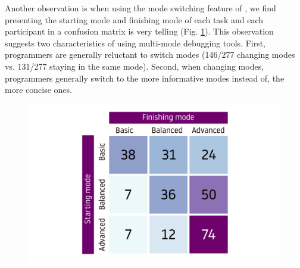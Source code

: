 Another observation is when using the mode switching feature of \chameleon{}, we find presenting the starting mode and finishing mode of each task and each participant in a confusion matrix is very telling (Fig. \ref{fig:r4-mode-switching}). 
This observation suggests two characteristics of using multi-mode debugging tools. First, programmers are generally reluctant to switch modes (146/277 changing modes vs. 131/277 staying in the same mode). Second, when changing modes, programmers generally switch to the more informative modes instead of, the more concise ones.
\begin{figure}[h]
    \centering
    \includegraphics[width=\linewidth]{images/mode-switching.pdf}
    \caption{
    }
    \label{fig:r4-mode-switching}
\end{figure}


